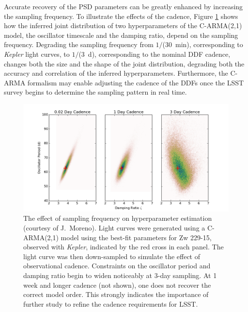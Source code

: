 Accurate recovery of the PSD parameters can be greatly enhanced by increasing the
sampling frequency. To illustrate the effects of the cadence, Figure \ref{CadenceEffect}
shows how the inferred joint distribution of two hyperparameters of the C-ARMA(2,1)
model, the oscillator timescale and the damping ratio, depend on the sampling frequency.
Degrading the sampling frequency from $1/$($30$~min), corresponding to {\em Kepler}
light curves, to $1/$($3$~d), corresponding to the nominal DDF cadence, changes both
the size and the shape of the joint distribution, degrading both the accuracy and
correlation of the inferred hyperparameters.
%
Furthermore, the C-ARMA formalism may enable adjusting the cadence of the DDFs once
the LSST survey begins to determine the sampling pattern in real time.

\begin{figure}
\centering\includegraphics[width=0.9\linewidth]{figs/agn/AGN_Variability_00.png}
\caption{The effect of sampling frequency on hyperparameter estimation (courtesy of
J.~Moreno). Light curves were generated using a C-ARMA(2,1) model using the best-fit
parameters for Zw 229-15, observed with {\em Kepler}, indicated by the red cross in
each panel. The light curve was then down-sampled to simulate the effect of observational
cadence. Constraints on the oscillator period and damping ratio begin to widen noticeably
at 3-day sampling. At 1 week and longer cadence (not shown), one does not recover the
correct model order. This strongly indicates the importance of further study to refine
the cadence requirements for LSST.
}
\label{CadenceEffect}
\end{figure}


